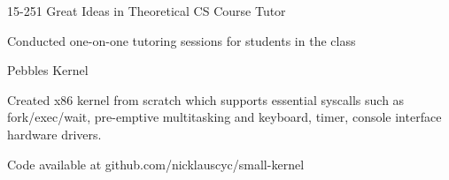 
\vspace{-3.5mm}

\begin{cventries}

    \begin{multicols}{2}
  \cventry
    {} %
{15-251 Great Ideas in Theoretical CS Course Tutor} %
    {}%
    {} %
    {
      \begin{cvitems} %
      \item {{Conducted one-on-one tutoring sessions for students in the class}}
      \end{cvitems}
    }



  \cventry
    {} %
    {Pebbles Kernel} %
    {} %
    {} %
    {
      \begin{cvitems} %
        \item {Created x86 kernel from scratch which supports essential syscalls
          \newline such as fork/exec/wait, pre-emptive multitasking and keyboard,
          \newline timer,
          console interface hardware drivers.}
        \item {Code available at github.com/nicklauscyc/small-kernel}
      \end{cvitems}
    }


\end{multicols}
\end{cventries}
